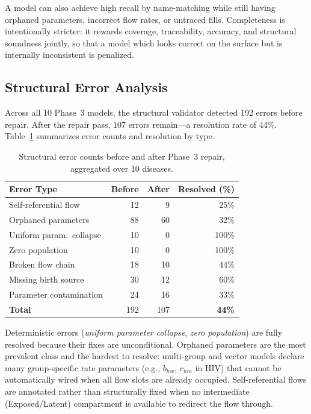 A model can also achieve high recall by name-matching while still having orphaned
parameters, incorrect flow rates, or untraced fills. Completeness is intentionally
stricter: it rewards coverage, traceability, accuracy, and structural soundness jointly,
so that a model which looks correct on the surface but is internally inconsistent is
penalized.

\subsection{Structural Error Analysis}

Across all 10 Phase~3 models, the structural validator detected 192 errors before repair.
After the repair pass, 107 errors remain---a resolution rate of 44\%.
Table~\ref{tab:structural} summarizes error counts and resolution by type.

\begin{table}[t]
\caption{Structural error counts before and after Phase~3 repair, aggregated over 10 diseases.}
\label{tab:structural}
\small
\begin{tabular}{lrrr}
\toprule
Error Type & Before & After & Resolved (\%) \\
\midrule
Self-referential flow       & 12 & 9  & 25\% \\
Orphaned parameters         & 88 & 60 & 32\% \\
Uniform param.\ collapse    & 10 & 0  & 100\% \\
Zero population             & 10 & 0  & 100\% \\
Broken flow chain           & 18 & 10 & 44\% \\
Missing birth source        & 30 & 12 & 60\% \\
Parameter contamination     & 24 & 16 & 33\% \\
\midrule
\textbf{Total}              & 192& 107& \textbf{44\%} \\
\bottomrule
\end{tabular}
\end{table}

Deterministic errors (\emph{uniform parameter collapse}, \emph{zero population}) are
fully resolved because their fixes are unconditional. Orphaned parameters are the most
prevalent class and the hardest to resolve: multi-group and vector models declare
many group-specific rate parameters (e.g., $b_{hw}$, $c_{hm}$ in HIV) that cannot be
automatically wired when all flow slots are already occupied.
Self-referential flows are annotated rather than structurally fixed when no
intermediate (Exposed/Latent) compartment is available to redirect the flow through.
